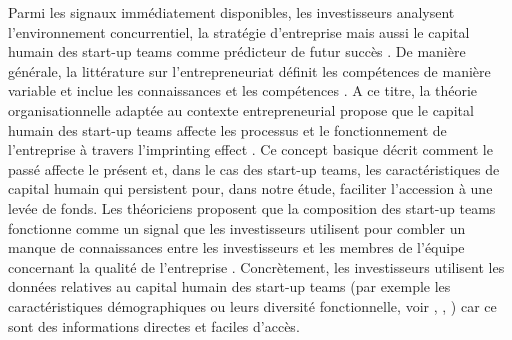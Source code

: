 \documentclass[12pt]{article}
\begin{document}
Parmi les signaux immédiatement disponibles, les investisseurs analysent l'environnement concurrentiel, la stratégie d'entreprise mais aussi le capital humain des start-up teams comme prédicteur de futur succès \citep{becker1964human}. De manière générale, la littérature sur l'entrepreneuriat définit les compétences de manière variable et inclue les connaissances et les compétences \citep{ngoasong2017digital}. A ce titre, la théorie organisationnelle adaptée au contexte entrepreneurial propose que le capital humain des start-up teams affecte les processus et le fonctionnement de l'entreprise à travers l'imprinting effect \citep{packalen2007complementing}. Ce concept basique décrit comment le passé affecte le présent et, dans le cas des start-up teams, les caractéristiques de capital humain qui persistent pour, dans notre étude, faciliter l'accession à une levée de fonds. Les théoriciens proposent que la composition des start-up teams fonctionne comme un signal \citep{spence1974market} que les investisseurs utilisent pour combler un manque de connaissances entre les investisseurs et les membres de l'équipe concernant la qualité de l'entreprise \citep{plummer2016better}. Concrètement, les investisseurs utilisent les données relatives au capital humain des start-up teams (par exemple les caractéristiques démographiques ou leurs diversité fonctionnelle, voir \citet{eddleston2016you}, \citet{beckman2007early}, \citet{colombo2005founders}) car ce sont des informations directes et faciles d'accès.
\end{document}

